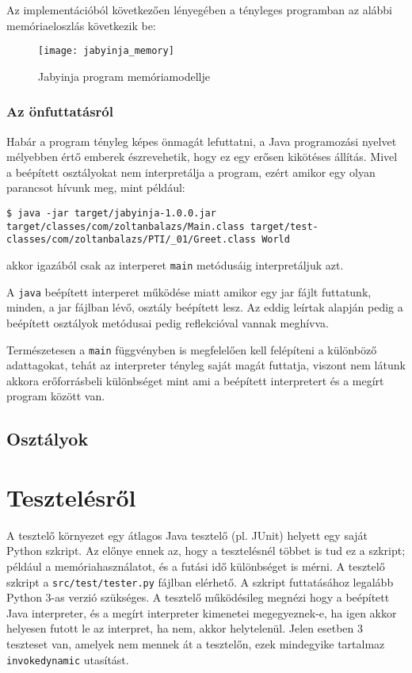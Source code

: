 Az implementációból következően lényegében a tényleges programban az alábbi memóriaeloszlás következik be:

\begin{figure}[H]
	\centering
	\texttt{[image: jabyinja\_memory]}
	\caption{Jabyinja program memóriamodellje}
	\label{fig:memory}
\end{figure}

\subsubsection{Az önfuttatásról}

Habár a program tényleg képes önmagát lefuttatni, a Java programozási nyelvet mélyebben értő emberek észrevehetik, hogy ez egy erősen kikötéses állítás. Mivel a beépített osztályokat nem interpretálja a program, ezért amikor egy olyan parancsot hívunk meg, mint például: 
\begin{verbatim}
$ java -jar target/jabyinja-1.0.0.jar target/classes/com/zoltanbalazs/Main.class target/test-classes/com/zoltanbalazs/PTI/_01/Greet.class World
\end{verbatim}
akkor igazából csak az interperet \lstinline{main} metódusáig interpretáljuk azt.

A \lstinline{java} beépített interperet működése miatt amikor egy jar fájlt futtatunk, minden, a jar fájlban lévő, osztály beépített lesz. Az eddig leírtak alapján pedig a beépített osztályok metódusai pedig reflekcióval vannak meghívva.

Természetesen a \lstinline{main} függvényben is megfelelően kell felépíteni a különböző adattagokat, tehát az interpreter tényleg saját magát futtatja, viszont nem látunk akkora erőforrásbeli különbséget mint ami a beépített interpretert és a megírt program között van.

\subsection{Osztályok}

\section{Tesztelésről}

A tesztelő környezet egy átlagos Java tesztelő (pl. JUnit) helyett egy saját Python szkript. Az előnye ennek az, hogy a tesztelésnél többet is tud ez a szkript; például a memóriahasználatot, és a futási idő különbséget is mérni. A tesztelő szkript a \lstinline{src/test/tester.py} fájlban elérhető. A szkript futtatásához legalább Python 3-as verzió szükséges. A tesztelő működésileg megnézi hogy a beépített Java interpreter, és a megírt interpreter kimenetei megegyeznek-e, ha igen akkor helyesen futott le az interpret, ha nem, akkor helytelenül. Jelen esetben 3 teszteset van, amelyek nem mennek át a tesztelőn, ezek mindegyike tartalmaz \lstinline{invokedynamic} utasítást.

